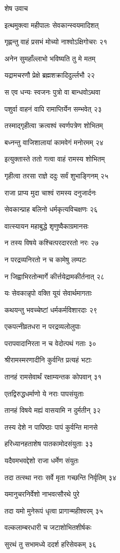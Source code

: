 शेष उवाच

इत्थमुक्त्वा महीपालः सेवकान्स्वयमादिशत्

गृह्णन्तु वाहं प्रसभं मोच्यो नाश्वोऽक्षिगोचरः २१

अनेन सुमहाँल्लाभो भविष्यति तु मे मतम्

यद्रामचरणौ प्रेक्षे ब्रह्मशक्रादिदुर्ल्लभौ २२

स एव धन्यः स्वजनः पुत्रो वा बान्धवोऽथवा

पशुर्वा वाहनं वापि रामाप्तिर्येन सम्भवेत् २३

तस्माद्गृहीत्वा क्रत्वश्वं स्वर्णपत्रेण शोभितम्

बध्नन्तु वाजिशालायां कामवेगं मनोरमम् २४

इत्युक्तास्ते ततो गत्वा वाहं रामस्य शोभितम्

गृहीत्वा तरसा राज्ञे ददुः सर्वं शुभाङ्गिनम् २५

राजा प्राप्य मुदा चाश्वं रामस्य दनुजार्दनः

सेवकान्प्राह बलिनो धर्मकृत्यविचक्षणः २६

वात्स्यायन महाबुद्धे शृणुष्वैकाग्रमानसः

न तस्य विषये कश्चित्परदाररतो नरः २७

न परद्रव्यनिरतो न च कामेषु लम्पटः

न जिह्वाभिरतोन्मार्गे कीर्त्तयेद्रामकीर्तनात् २८

यः सेवकान्नृपो वक्ति यूयं सेवार्थमागताः

कथयन्तु भवच्चेष्टां धर्मकर्मविशारदाः २९

एकपत्नीव्रतधरा न परद्रव्यलोलुपाः

परापवादानिरता न च वेदोत्पथं गताः ३०

श्रीरामस्मरणादीनि कुर्वन्ति प्रत्यहं भटाः

तानहं रामसेवार्थं रक्षाम्यन्तक कोपवान् ३१

एतद्विरुद्धधर्माणो ये नराः पापसंयुताः

तानहं विषये मह्यं वासयामि न दुर्मतीन् ३२

तस्य देशे न पापिष्ठाः पापं कुर्वन्ति मानसे

हरिध्यानहताशेष पातकामोदसंयुताः ३३

यदैवमभवद्देशो राजा धर्मेण संयुतः

तदा तत्स्था नराः सर्वे मृता गच्छन्ति निर्वृतिम् ३४

यमानुचरनिर्वेशो नाभवत्सौरथे पुरे

तदा यमो मुनेरूपं धृत्वा प्रागान्महीश्वरम् ३५

वल्कलाम्बरधारी च जटाशोभितशीर्षकः

सुरथं तु सभामध्ये ददर्श हरिसेवकम् ३६

